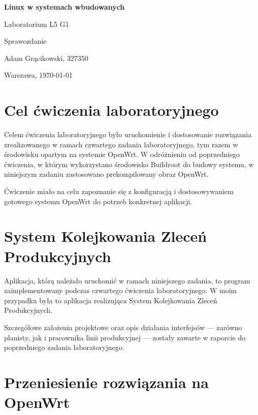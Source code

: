 \documentclass{article}
\begin{document}
\begin{titlepage}
    \centering
    \vfill    
    {\fontsize{40}{20}\selectfont \textbf{Linux w systemach wbudowanych} \par}
    \vspace{2cm}
    {\fontsize{30}{20}\selectfont Laboratorium L5 G1\par}
    \vspace{2cm}
    {\fontsize{20}{20}\selectfont Sprawozdanie\par}
    \vfill
    {\fontsize{10}{20}\selectfont Adam Grącikowski, 327350\par}
    \vspace{1cm}
    Warszawa, \today
\end{titlepage}



\tableofcontents
\newpage
\section{Cel ćwiczenia laboratoryjnego}

Celem ćwiczenia laboratoryjnego było uruchomienie i dostosowanie rozwiązania zrealizowanego w ramach czwartego zadania laboratoryjnego, tym razem w środowisku opartym na systemie OpenWrt. W odróżnieniu od poprzedniego ćwiczenia, w którym wykorzystano środowisko Buildroot do budowy systemu, w niniejszym zadaniu zastosowano prekompilowany obraz OpenWrt. 

Ćwiczenie miało na celu zapoznanie się z konfiguracją i dostosowywaniem gotowego systemu OpenWrt do potrzeb konkretnej aplikacji.

\section{System Kolejkowania Zleceń Produkcyjnych}

Aplikacja, którą należało uruchomić w ramach niniejszego zadania, to program zaimplementowany podczas czwartego ćwiczenia laboratoryjnego. W moim przypadku była to aplikacja realizująca System Kolejkowania Zleceń Produkcyjnych.

Szczegółowe założenia projektowe oraz opis działania interfejsów — zarówno planisty, jak i pracownika linii produkcyjnej — zostały zawarte w raporcie do poprzedniego zadania laboratoryjnego.

\section{Przeniesienie rozwiązania na OpenWrt}
\end{document}
